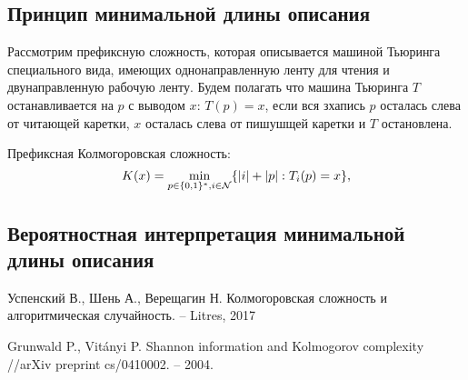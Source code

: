 \documentclass[../main.tex]{subfiles}
\begin{document}
\subsection{Принцип минимальной длины описания}
Рассмотрим префиксную сложность, которая описывается машиной Тьюринга специального вида, имеющих однонаправленную ленту для чтения и двунаправленную рабочую ленту. Будем полагать что машина Тьюринга $T$ останавливается на $p$ с выводом $x$: $T(p) = x$, если вся зхапись $p$ осталась слева от читающей каретки, $x$ осталась слева от пишушщей каретки и $T$ остановлена.
\begin{definition}
Префиксная Колмогоровская сложность:
\[
K(x) = \min_{p \in \{0,1\}^* ,i \in \mathcal{N}}\{|i|+|p|: T_i(p) = x\},
\]
\end{definition}

\subsection{Вероятностная интерпретация минимальной длины описания}




\begin{thebibliography}{99}
	Успенский В., Шень А., Верещагин Н. Колмогоровская сложность и алгоритмическая случайность. – Litres, 2017

Grunwald P., Vitányi P. Shannon information and Kolmogorov complexity //arXiv preprint cs/0410002. – 2004.
\end{thebibliography}
\end{document}

